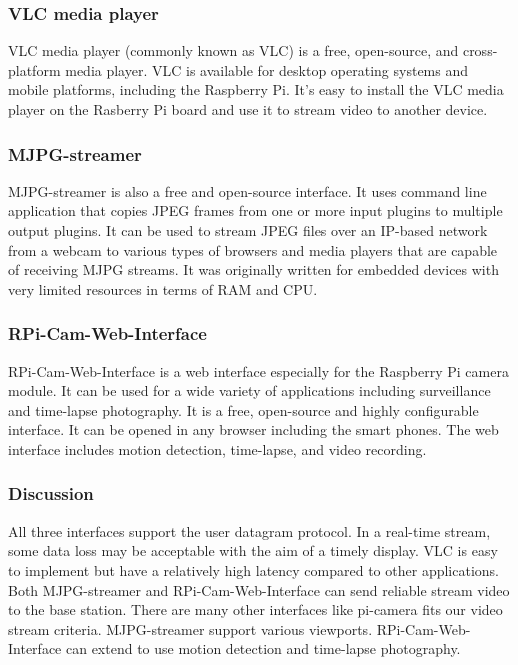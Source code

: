 \documentclass[onecolumn, draftclsnofoot,10pt, compsoc]{IEEEtran}
\begin{document}
\subsubsection{VLC media player}
VLC media player (commonly known as VLC)\cite{r18} is a free, open-source, and cross-platform media player. VLC is available for desktop operating systems and mobile platforms, including the Raspberry Pi. It's easy to install the VLC media player on the Rasberry Pi board and use it to stream video to another device.

\subsubsection{ MJPG-streamer }
MJPG-streamer\cite{r20} is also a free and open-source interface. It uses command line application that copies JPEG frames from one or more input plugins to multiple output plugins. It can be used to stream JPEG files over an IP-based network from a webcam to various types of browsers and media players that are capable of receiving MJPG streams. It was originally written for embedded devices with very limited resources in terms of RAM and CPU.

\subsubsection{ RPi-Cam-Web-Interface}
RPi-Cam-Web-Interface\cite{r23} is a web interface especially for the Raspberry Pi camera module. It can be used for a wide variety of applications including surveillance and time-lapse photography. It is a free, open-source and highly configurable interface. It can be opened in any browser including the smart phones. The web interface includes motion detection, time-lapse, and video recording.

\subsubsection{Discussion}
All three interfaces support the user datagram protocol. In a real-time stream, some data loss may be acceptable with the aim of a timely display. VLC is easy to implement but have a relatively high latency compared to other applications. Both MJPG-streamer and RPi-Cam-Web-Interface can send reliable stream video to the base station. There are many other interfaces like pi-camera fits our video stream criteria. MJPG-streamer support various viewports. RPi-Cam-Web-Interface can extend to use motion detection and time-lapse photography.
\end{document}
